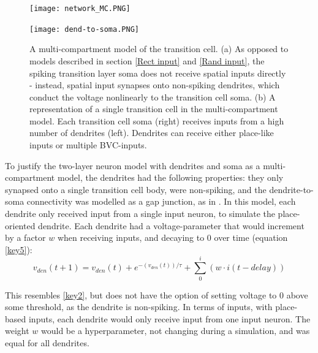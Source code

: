 \documentclass{article}
\begin{document}
    \begin{figure}[h]
        \begin{minipage}[b]{\textwidth}
            \subcaption{}
            \texttt{[image: network\_MC.PNG]}
        \end{minipage}
        \begin{minipage}[t]{0.35\textwidth}
            \subcaption{}
            \texttt{[image: dend-to-soma.PNG]}
        \end{minipage}
        \hspace{0.1\textwidth}
        \begin{minipage}[t]{0.54\textwidth}
            \caption{A multi-compartment model of the transition cell. (a) As opposed to models described in section \ref{Rect input} and \ref{Rand input}, the spiking transition layer soma does not receive spatial inputs directly - instead, spatial input synapses onto non-spiking dendrites, which conduct the voltage nonlinearly to the transition cell soma. (b) A representation of a single transition cell in the multi-compartment model. Each transition cell soma (right) receives inputs from a high number of dendrites (left). Dendrites can receive either place-like inputs or multiple BVC-inputs.}
            \label{network_MC}
        \end{minipage}
    \end{figure}

    To justify the two-layer neuron model with dendrites and soma as a multi-compartment model, the dendrites had the following properties: they only synapsed onto a single transition cell body, were non-spiking, and the dendrite-to-soma connectivity was modelled as a gap junction, as in \parencite{Alabi2022}. In this model, each dendrite only received input from a single input neuron, to simulate the place-oriented dendrite. Each dendrite had a voltage-parameter that would increment by a factor \(w\) when receiving inputs, and decaying to 0 over time (equation \ref{key5}):
        \begin{equation}\label{key5} v_{den}(t + 1) = v_{den}(t) + e^{-(v_{den}(t))/\tau} + \sum_{0}^{i} (w \cdot i(t-delay)) \end{equation}
    
    This resembles \ref{key2}, but does not have the option of setting voltage to 0 above some threshold, as the dendrite is non-spiking. In terms of inputs, with place-based inputs, each dendrite would only receive input from one input neuron. The weight \(w\) would be a hyperparameter, not changing during a simulation, and was equal for all dendrites.
    
\end{document}
